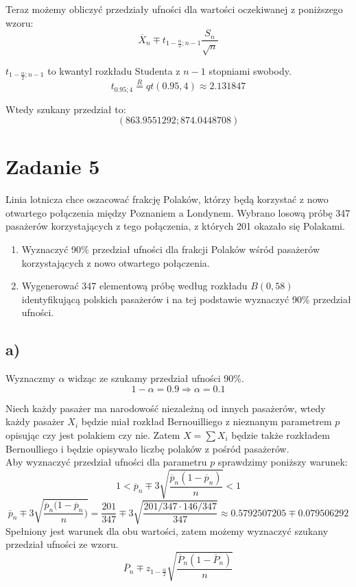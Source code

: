 \documentclass{article}
\begin{document}
Teraz możemy obliczyć przedziały ufności dla wartości oczekiwanej z poniższego wzoru:
\[ \overline{X}_n \mp t_{1-\frac{\alpha}{2};n-1} \frac{S_n}{\sqrt{n}} \]

$t_{1-\frac{\alpha}{2};n-1}$ to kwantyl rozkładu Studenta z $n-1$ stopniami swobody.
\[ t_{0.95;4} \overset{R}{=} qt(0.95,4) \approx 2.131847 \]

Wtedy szukany przedział to:
\[ (863.9551292; 874.0448708) \] 

\section{Zadanie 5}
Linia lotnicza chce oszacować frakcję Polaków, którzy będą korzystać z nowo otwartego połączenia między Poznaniem a Londynem. Wybrano losową próbę 347 pasażerów korzystających z tego połączenia, z których 201 okazało się Polakami.
\begin{enumerate}[label = \alph*)]
\item Wyznaczyć 90\% przedział ufności dla frakcji Polaków wśród pasażerów korzystających z nowo otwartego połączenia.
\item Wygenerować 347 elementową próbę według rozkładu $B(0,58)$ identyfikującą polskich pasażerów i na tej podstawie wyznaczyć 90\% przedział ufności.
\end{enumerate}

\subsection{a)}
Wyznaczmy $\alpha$ widząc ze szukamy przedział ufności 90\%.
\[ 1 - \alpha = 0.9 \Rightarrow \alpha = 0.1 \]

Niech każdy pasażer ma narodowość niezależną od innych pasażerów, wtedy każdy pasażer $X_i$ będzie miał rozkład Bernouilliego z nieznanym parametrem $p$ opisując czy jest polakiem czy nie. Zatem $X = \sum X_i$ będzie także rozkładem Bernoulliego i będzie opisywało liczbę polaków z pośród pasażerów. \\
Aby wyznaczyć przedział ufności dla parametru $p$ sprawdzimy poniższy warunek:
\[ 1 < \overline{p}_n \mp 3\sqrt{\frac{\overline{p}_n(1-\overline{p}_n) }{n}} < 1 \]
\[ \overline{p}_n \mp 3\sqrt{\frac{\overline{p}_n(1-\overline{p}_n}{n}) } = \frac{201}{347} \mp 3\sqrt{\frac{201/347\cdot 146/347}{347}} \approx 0.5792507205 \mp 0.079506292 \]
Spełniony jest warunek dla obu wartości, zatem możemy wyznaczyć szukany przedział ufności ze wzoru.
\[ \overline{P}_n \mp z_{1-\frac{\alpha}{2}} \sqrt{\frac{\overline{P}_n(1-\overline{P}_n) }{n}} \]
\end{document}

